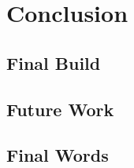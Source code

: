 \documentclass{article}
\begin{document}

\section{Conclusion}

\subsection{Final Build}

\subsection{Future Work}

\subsection{Final Words}


\clearpage



\end{document}
